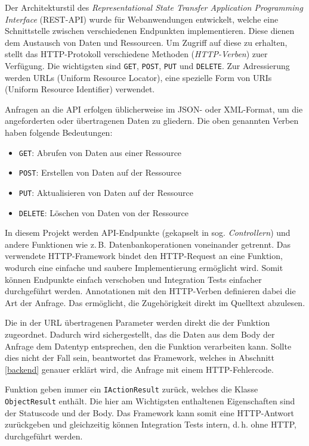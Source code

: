 Der Architekturstil des \emph{Representational State Transfer Application Programming Interface} (REST-API) wurde für Webanwendungen entwickelt, welche eine Schnittstelle zwischen verschiedenen Endpunkten implementieren. 
Diese dienen dem Austausch von Daten und Ressourcen. 
Um Zugriff auf diese zu erhalten, stellt das HTTP-Protokoll verschiedene Methoden (\emph{HTTP-Verben}) zuer Verfügung. Die wichtigsten sind \texttt{GET}, \texttt{POST}, \texttt{PUT} und \texttt{DELETE}. 
Zur Adressierung werden URLs (Uniform  Resource Locator), eine spezielle Form von URIs (Uniform Resource Identifier) verwendet.

Anfragen an die API erfolgen üblicherweise im JSON- oder XML-Format, um die angeforderten oder übertragenen Daten zu gliedern. 
Die oben genannten Verben haben folgende Bedeutungen:
\begin{itemize}
	\item \texttt{GET}: Abrufen von Daten aus einer Ressource
	\item \texttt{POST}: Erstellen von Daten auf der Ressource
	\item \texttt{PUT}: Aktualisieren von Daten auf der Ressource
	\item \texttt{DELETE}: Löschen von Daten von der Ressource
\end{itemize}

In diesem Projekt werden API-Endpunkte (gekapselt in sog. \emph{Controllern}) und andere Funktionen wie z.\,B. Datenbankoperationen voneinander getrennt.
Das verwendete HTTP-Framework bindet den HTTP-Request an eine Funktion, wodurch eine einfache und saubere Implementierung ermöglicht wird.
Somit können Endpunkte einfach verschoben und Integration Tests einfacher durchgeführt werden.
Annotationen mit den HTTP-Verben definieren dabei die Art der Anfrage.
Das ermöglicht, die Zugehörigkeit direkt im Quelltext abzulesen.

Die in der URL übertragenen Parameter werden direkt die der Funktion zugeordnet.
Dadurch wird sichergestellt, das die Daten aus dem Body der Anfrage dem Datentyp entsprechen, den die Funktion verarbeiten kann.
Sollte dies nicht der Fall sein, beantwortet das Framework, welches in Abschnitt \ref{backend} genauer erklärt wird, die Anfrage mit einem HTTP-Fehlercode.

Funktion geben immer ein \texttt{IActionResult} zurück, welches die Klasse \texttt{ObjectResult} enthält.
Die hier am Wichtigsten enthaltenen Eigenschaften sind der Statuscode und der Body.
Das Framework kann somit eine HTTP-Antwort zurückgeben und gleichzeitig können Integration Tests intern, d.\,h. ohne HTTP, durchgeführt werden.